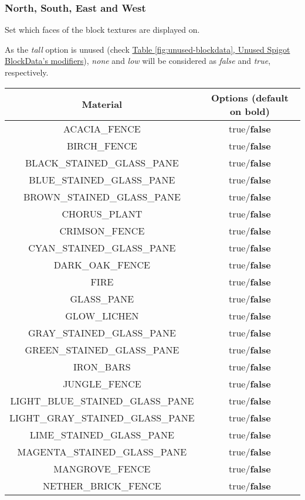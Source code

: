 \subsubsection{North, South, East and West}
Set which faces of the block textures are displayed on.

As the \textit{tall} option is unused (check \hyperref[fig:unused-blockdata]{Table \ref{fig:unused-blockdata}, Unused Spigot BlockData's modifiers}), \textit{none} and \textit{low} will be considered as \textit{false} and \textit{true}, respectively.

\begin{longtable}{ |c|c| }
	\hline
	Material & Options (default on bold) \\
	\hline
	\endhead
	ACACIA\_FENCE & true/\textbf{false} \\
	BIRCH\_FENCE & true/\textbf{false} \\
	BLACK\_STAINED\_GLASS\_PANE & true/\textbf{false} \\
	BLUE\_STAINED\_GLASS\_PANE & true/\textbf{false} \\
	BROWN\_STAINED\_GLASS\_PANE & true/\textbf{false} \\
	CHORUS\_PLANT & true/\textbf{false} \\
	CRIMSON\_FENCE & true/\textbf{false} \\
	CYAN\_STAINED\_GLASS\_PANE & true/\textbf{false} \\
	DARK\_OAK\_FENCE & true/\textbf{false} \\
	FIRE & true/\textbf{false} \\
	GLASS\_PANE & true/\textbf{false} \\
	GLOW\_LICHEN & true/\textbf{false} \\
	GRAY\_STAINED\_GLASS\_PANE & true/\textbf{false} \\
	GREEN\_STAINED\_GLASS\_PANE & true/\textbf{false} \\
	IRON\_BARS & true/\textbf{false} \\
	JUNGLE\_FENCE & true/\textbf{false} \\
	LIGHT\_BLUE\_STAINED\_GLASS\_PANE & true/\textbf{false} \\
	LIGHT\_GRAY\_STAINED\_GLASS\_PANE & true/\textbf{false} \\
	LIME\_STAINED\_GLASS\_PANE & true/\textbf{false} \\
	MAGENTA\_STAINED\_GLASS\_PANE & true/\textbf{false} \\
	MANGROVE\_FENCE & true/\textbf{false} \\
	NETHER\_BRICK\_FENCE & true/\textbf{false} \\

\end{longtable}
